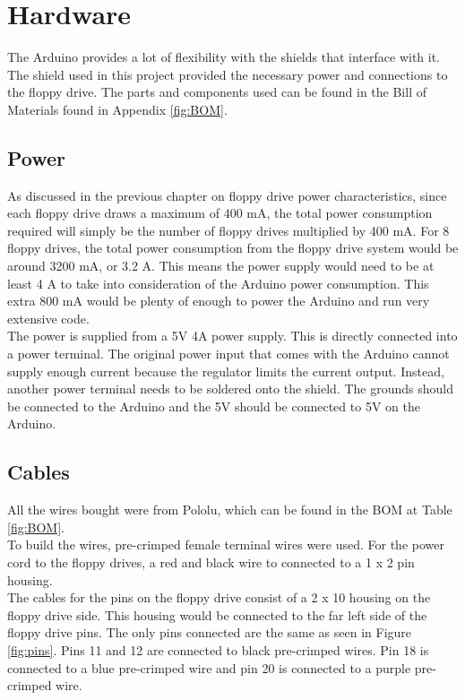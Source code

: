\documentclass[11pt, a4paper]{report}
\begin{document}
\chapter{Hardware}

The Arduino provides a lot of flexibility with the shields that interface with it. The shield used in this project provided the necessary power and connections to the floppy drive. The parts and components used can be found in the Bill of Materials found in Appendix \ref{fig:BOM}.

\section{Power}

As discussed in the previous chapter on floppy drive power characteristics, since each floppy drive draws a maximum of 400 mA, the total power consumption required will simply be the number of floppy drives multiplied by 400 mA. For 8 floppy drives, the total power consumption from the floppy drive system would be around 3200 mA, or 3.2 A. This means the power supply would need to be at least 4 A to take into consideration of the Arduino power consumption. This extra 800 mA would be plenty of enough to power the Arduino and run very extensive code. \\

The power is supplied from a 5V 4A power supply. This is directly connected into a power terminal. The original power input that comes with the Arduino cannot supply enough current because the regulator limits the current output. Instead, another power terminal needs to be soldered onto the shield. The grounds should be connected to the Arduino and the 5V should be connected to 5V on the Arduino. \\
  
\section{Cables}
All the wires bought were from Pololu, which can be found in the BOM at Table \ref{fig:BOM}. \\

To build the wires, pre-crimped female terminal wires were used. For the power cord to the floppy drives, a red and black wire to connected to a 1 x 2 pin housing. \\

The cables for the pins on the floppy drive consist of a 2 x 10 housing on the floppy drive side. This housing would be connected to the far left side of the floppy drive pins. The only pins connected are the same as seen in Figure \ref{fig:pins}. Pins 11 and 12 are connected to black pre-crimped wires. Pin 18 is connected to a blue pre-crimped wire and pin 20 is connected to a purple pre-crimped wire. \\
\end{document}
